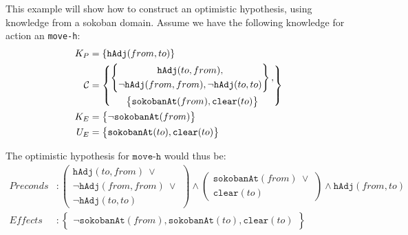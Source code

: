 \documentclass[\master/Master.tex]{subfiles}
\begin{document}
	\begin{example}
		This example will show how to construct an optimistic hypothesis, using knowledge from a sokoban domain.
		Assume we have the following knowledge for action an \texttt{move-h}:
		 	\begin{equation*}
			 	\begin{split}
				 	K_P & = \left\{\texttt{hAdj}(from, to) \right\} \\
					\mathcal{C}& =	\left\{
							\begin{gathered}
								\left\{
								\begin{gathered}
									\texttt{hAdj}(to, from), \\
									\neg\texttt{hAdj}(from, from), \neg\texttt{hAdj}(to, to)
								\end{gathered}
								\right\},	\\ \left\{
								\begin{gathered}
									\texttt{sokobanAt}(from), \texttt{clear}(to)
								\end{gathered}
								\right\}
							\end{gathered}
							\right\}
				 	\\
				 	K_E& =
						 	\left\{
						 	\begin{gathered}
							 	\neg\texttt{sokobanAt}(from)
						 	\end{gathered}
						 	\right\}
					\\
				 	U_E& =
					 	\left\{
					 	\begin{gathered}
						 	\texttt{sokobanAt}(to),
						 	\texttt{clear}(to)
					 	\end{gathered}
					 	\right\}
				\end{split}
		 	\end{equation*}

		The optimistic hypothesis for $\texttt{move-h}$ would thus be:
			\begin{equation*}
				\begin{split}
					Preconds& :\left(
									 \begin{gathered}
									   \texttt{hAdj}(to, from) ~ \lor \\
									  \neg\texttt{hAdj}(from, from) ~ \lor \\ \neg\texttt{hAdj}(to, to)
									 \end{gathered}
								  \right) \land
								  \left(
									  \begin{gathered}
										  \texttt{sokobanAt}(from) ~ \lor \\ \texttt{clear}(to)
									  \end{gathered}
								  \right) \land \texttt{hAdj}(from, to) \\
					Effects &: 	\left\{
									\begin{gathered}
										\neg\texttt{sokobanAt}(from),
										\texttt{sokobanAt}(to),
										\texttt{clear}(to)
									\end{gathered}
								\right\}
				\end{split}
			\end{equation*}
	\end{example}
\end{document}
